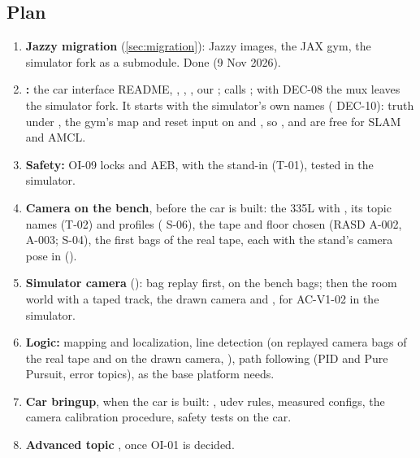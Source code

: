 \documentclass[11pt,a4paper]{article}
\begin{document}
\subsection{Plan}
\begin{enumerate}
  \item \textbf{Jazzy migration} (\cref{sec:migration}): Jazzy images, the JAX gym, the simulator fork as a submodule. Done (9 Nov 2026).
  \item \textbf{:} the car interface README, , , , our ;  calls ; with DEC-08 the mux leaves the simulator fork. It starts with the simulator's own names ( DEC-10): truth under , the gym's map and reset input on  and , so ,  and  are free for SLAM and AMCL.
  \item \textbf{Safety:} OI-09 locks and AEB, with the  stand-in (T-01), tested in the simulator.
  \item \textbf{Camera on the bench}, before the car is built: the 335L with , its topic names (T-02) and profiles ( S-06), the tape and floor chosen (RASD A-002, A-003;  S-04), the first bags of the real tape, each with the stand's camera pose in  ().
  \item \textbf{Simulator camera} (): bag replay first, on the bench bags; then the room world with a taped track, the drawn camera and , for AC-V1-02 in the simulator.
  \item \textbf{Logic:} mapping and localization, line detection (on replayed camera bags of the real tape and on the drawn camera, ), path following (PID and Pure Pursuit, error topics), as the base platform needs.
  \item \textbf{Car bringup}, when the car is built: , udev rules, measured configs, the camera calibration procedure, safety tests on the car.
  \item \textbf{Advanced topic} , once OI-01 is decided.
\end{enumerate}
\end{document}
